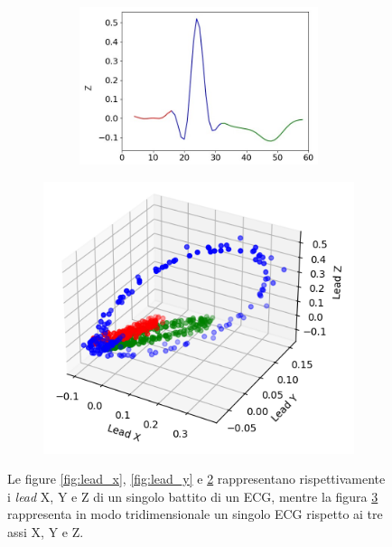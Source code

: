 \begin{figure}[H]
\begin{subfigure}{0.4\textwidth}
\begin{subfigure}{\textwidth}
            \includegraphics[width=1\textwidth]{immagini/lead_z.png}
            \caption{}
            \label{fig:lead_z}
        \end{subfigure}
    \end{subfigure}
    \begin{subfigure}{0.55\textwidth}
        \centering
        \includegraphics[width=1\linewidth]{immagini/frank3d.png}
        \captionsetup{justification=centering}
        \caption{}
        \label{fig:frank3d}
    \end{subfigure}
    \captionsetup{justification=centering}
    \caption{Le figure \ref{fig:lead_x}, \ref{fig:lead_y} e \ref{fig:lead_z} rappresentano rispettivamente i \textit{lead} X, Y e Z di un singolo battito di un ECG, mentre la figura \ref{fig:frank3d} rappresenta in modo tridimensionale un singolo ECG rispetto ai tre assi X, Y e Z.}
    \label{fig:ecg}
\end{figure}

